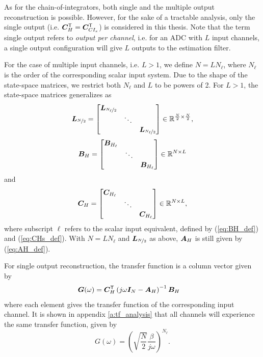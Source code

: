 As for the chain-of-integrators, both single and the multiple output reconstruction is possible. However, for the sake of a tractable analysis, only the single output (i.e. $\bm{C}^\mathsf{T}_H = \bm{C}^\mathsf{T}_{CI_s}$) is considered in this thesis. Note that the term single output refers to \textit{output per channel}, i.e. for an ADC with $L$ input channels, a single output configuration will give $L$ outputs to the estimation filter.

For the case of multiple input channels, i.e. $L>1$, we define $N = L N_\ell$, where $N_\ell$ is the order of the corresponding scalar input system. Due to the shape of the state-space matrices, we restrict both $N_\ell$ and $L$ to be powers of 2. For $L>1$, the state-space matrices generalizes as
\begin{equation}
    \bm{L}_{\nicefrac{N}{2}} =
    \begin{bmatrix}
        \bm{L}_{\nicefrac{N_\ell}{2}} \\
        &  \ddots & \\
        & & \bm{L}_{\nicefrac{N_\ell}{2}}
    \end{bmatrix}
    \in \mathbb{R}^{\frac{N}{2} \times \frac{N}{2}},
\end{equation}
\begin{equation}
    \bm{B}_H =
    \begin{bmatrix}
        \bm{B}_{H_\ell} \\
        &  \ddots & \\
        & & \bm{B}_{H_\ell}
    \end{bmatrix}
    \in \mathbb{R}^{N \times L}
\end{equation}
and
\begin{equation}
    \bm{C}_H =
    \begin{bmatrix}
        \bm{C}_{H_\ell} \\
        &  \ddots & \\
        & & \bm{C}_{H_\ell}
    \end{bmatrix}
    \in \mathbb{R}^{N \times L},
\end{equation}
where subscript $\ell$ refers to the scalar input equivalent, defined by (\ref{eq:BH_def}) and (\ref{eq:CHs_def}).
With $N=LN_\ell$ and $\bm{L}_{\nicefrac{N}{2}}$ as above, $\bm{A}_H$ is still given by (\ref{eq:AH_def}).

For single output reconstruction, the transfer function is a column vector given by
\begin{align}
    \bm{G}(\omega) & = \bm{C}^\mathsf{T}_H \left( j\omega \bm{I}_{N} - \bm{A}_H \right)^{-1} \bm{B}_H
\end{align}
where each element gives the transfer function of the corresponding input channel. It is shown in appendix \ref{a:tf_analysis} that all channels will experience the same transfer function, given by
\begin{equation}
    \label{eq:hci_tf}
    G(\omega) = \left( \sqrt{\frac{N}{2}}\frac{\beta}{j\omega} \right)^{N_\ell}.
\end{equation}











